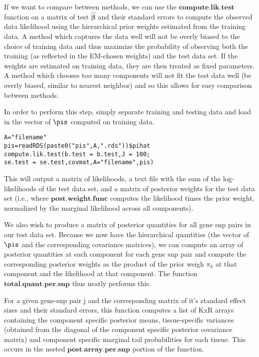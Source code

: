 \documentclass[10pt]{article}
\begin{document}
If we want to compare between methods, we can use the $\textbf{compute.lik.test}$ function on a matrix of test $\hat{\bm{\beta}}$ and their standard errors to compute the observed data likelihood using the hierarchical prior weights estimated from the training data. A method which captures the data well will not be overly biased to the choice of training data and thus maximize the probability of observing both the training (as reflected in the EM-chosen weights) and the test data set. If the weights are estimated on training data, they are then treated as fixed parameters. A method which chooses too many components will not fit the test data well (be overly biased, similar to nearest neighbor) and so this allows for easy comparison between methods.

In order to perform this step, simply separate training and testing data and load in the vector of $\pis$ computed on training data.

\begin{verbatim}
A="filename"
pis=readRDS(paste0("pis",A,".rds"))$pihat
compute.lik.test(b.test = b.test,J = 100;
se.test = se.test,covmat,A="filename",pis) 
\end{verbatim}

This will output a matrix of likelihoods, a text file with the sum of the log-likelihoods of the test data set, and a matrix of posterior weights for the test data set (i.e., where $\textbf{post.weight.func}$ computes the likelihood times the prior weight, normalized by the marginal likelihood across all components).

We also wish to produce a matrix of posterior quantities for all gene snp pairs in our test data set. Because we now have the hierarchical quantities (the vector of $\pis$ and the corresponding covariance matrices), we can compute an array of posterior quantities at each component for each gene snp pair and compute the corresponding posterior weights as the product of the prior weigh $\pi_{k}$ at that component and the likelihood at that component. The function $\textbf{total.quant.per.snp}$ thus neatly performs this.

For a given gene-snp pair j and the corresponding matrix of it's standard effect sizes and their standard errors, this function computes a list of KxR arrays  containing the component specific posterior means, tissue-specific variances (obtained from the diagonal of the component specific posterior covariance matrix) and component specific marginal tail probabilities for each tissue. This occurs in the nested $\textbf{post.array.per.snp}$ portion of the function.
\end{document}
